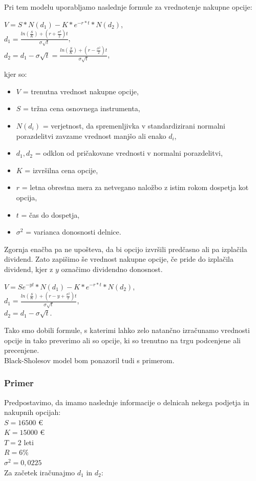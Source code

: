 Pri tem modelu uporabljamo naslednje formule za vrednotenje nakupne opcije:\\
\begin{center}
$V=S * N(d_1) - K * e^{-r*t} * N(d_2)$, 
\\[0,5 cm]
$d_1 = \tfrac{ln(\tfrac{S}{K}) + (r + \tfrac{\sigma^2}{2}) t}{\sigma \sqrt{t}}$, 
\\[0,5 cm]
$d_2 = d_1 - \sigma \sqrt{t} =  \tfrac{ln(\tfrac{S}{K}) + (r - \tfrac{\sigma^2}{2}) t}{\sigma \sqrt{t}}$,
\end{center}

kjer so:
\begin{itemize}
\item $V$ = trenutna vrednost nakupne opcije,
\item $S$ = tržna cena osnovnega instrumenta,
\item $N(d_i)$ = verjetnost, da spremenljivka v standardizirani normalni porazdelitvi zavzame vrednost manjšo ali enako $d_i$,
\item $d_1,d_2$ = odklon od pričakovane vrednosti v normalni porazdelitvi,
\item $K$ = izvršilna cena opcije,
\item $r$ = letna obrestna mera za netvegano naložbo z istim rokom dospetja kot opcija,
\item $t$ = čas do dospetja,
\item $\sigma^2$ = varianca donosnosti delnice.
\end{itemize}

Zgornja enačba pa ne upošteva, da bi opcijo izvršili predčasno ali pa izplačila dividend. Zato zapišimo še vrednost nakupne opcije, če pride do izplačila dividend, kjer z $y$ označimo dividendno donosnost.
\begin{center}
$V=Se^{-yt}  * N(d_1) - K * e^{-r*t} * N(d_2)$, 
\\[0,5 cm]
$d_1 = \tfrac{ln(\tfrac{S}{K}) + (r - y + \tfrac{\sigma^2}{2}) t}{\sigma \sqrt{t}}$, 
\\[0,5 cm]
$d_2 = d_1 - \sigma \sqrt{t}$.
\end{center}

Tako smo dobili formule, s katerimi lahko zelo natančno izračunamo vrednosti opcije in tako preverimo ali so opcije, ki so trenutno na trgu podcenjene ali precenjene.\\
Black-Sholesov model bom ponazoril tudi s primerom.\\

\subsubsection{Primer}
Predpostavimo, da imamo naslednje informacije o delnicah nekega podjetja in nakupnih opcijah:\\
$S = 16500$ €\\
$K = 15000$ €\\
$T = 2$ leti\\
$R = 6 \%$\\
$\sigma^2 = 0,0225$ \\
Za začetek iračunajmo $d_1$ in $d_2$:\\


